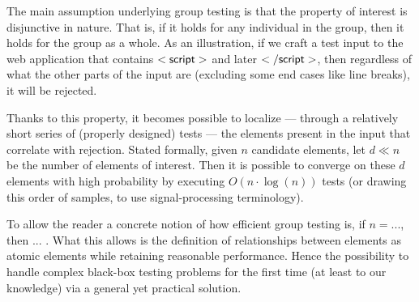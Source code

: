 The main assumption underlying group testing is that the property of interest is disjunctive in nature. That is, if it holds for any individual in the group, then it holds for the group as a whole. As an illustration, if we craft a test input to the web application that contains ${\sf <script>}$ and later ${\sf </script>}$, then regardless of what the other parts of the input are (excluding some end cases like line breaks), it will be rejected.

Thanks to this property, it becomes possible to localize --- through a relatively short series of (properly designed) tests --- the elements present in the input that correlate with rejection. Stated formally, given $n$ candidate elements, let $d \ll n$ be the number of elements of interest. Then it is possible to converge on these $d$ elements with high probability by executing $O(n \cdot \log (n))$ tests (or drawing this order of samples, to use signal-processing terminology).

To allow the reader a concrete notion of how efficient group testing is, if $n=...$, then ... . What this allows is the definition of relationships between elements as atomic elements while retaining reasonable performance. Hence the possibility to handle complex black-box testing problems for the first time (at least to our knowledge) via a general yet practical solution.